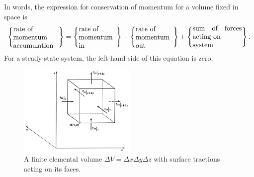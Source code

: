 \documentclass[twoside,11pt]		{report}
\begin{document}

In words, the expression for conservation of momentum for a volume
fixed in space is
\begin{equation}
\left\{ \parbox{23mm}{rate of\\ momentum\\ accumulation} \right\}=
\left\{ \parbox{19mm}{rate of\\ momentum\\ in} \right\}-
\left\{ \parbox{19mm}{rate of\\ momentum\\ out} \right\}+
\left\{ \parbox{25mm}{sum of forces acting on\\ system} \right\}.
\label{eq.mom_bal_words}
\end{equation}
For a steady-state system, the left-hand-side of this equation is
zero.

\begin{figure}
\begin{center}
\includegraphics[width=0.5\textwidth]{BSL-3.1-2.eps}
\end{center}
\caption{A finite elemental volume $\Delta V=\Delta x\Delta y\Delta z$
with surface tractions acting on its faces.}
\label{fig.momV}
\end{figure}
\end{document}
